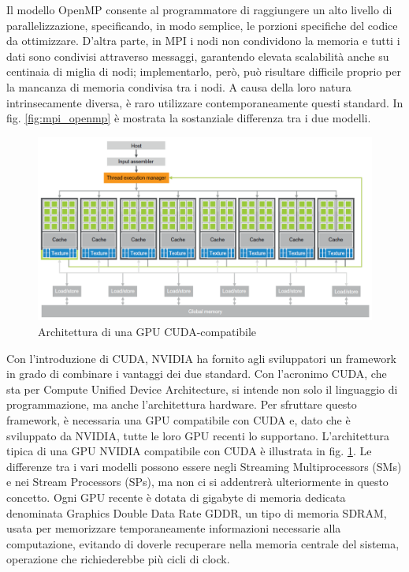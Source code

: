 Il modello OpenMP consente al programmatore di raggiungere un alto livello di parallelizzazione, specificando, in modo semplice, le porzioni specifiche del codice da ottimizzare. D'altra parte, in MPI i nodi non condividono la memoria e tutti i dati sono condivisi attraverso messaggi, garantendo elevata scalabilità anche su centinaia di miglia di nodi; implementarlo, però,  può risultare difficile proprio per la mancanza di memoria condivisa tra i nodi. A causa della loro natura intrinsecamente diversa, è raro utilizzare contemporaneamente questi standard. In fig. \ref{fig:mpi_openmp} è mostrata la sostanziale differenza tra i due modelli.

\begin{figure}[ht]
    \centering
    \includegraphics[width=.9\linewidth]{images/chapter2/cuda_arch.png}
    \caption{Architettura di una GPU CUDA-compatibile}
    \label{fig:cuda_arch}
\end{figure}

Con l'introduzione di CUDA, NVIDIA ha fornito agli sviluppatori un framework in grado di combinare i vantaggi dei due standard. Con l'acronimo CUDA, che sta per Compute Unified Device Architecture, si intende non solo il linguaggio di programmazione, ma anche l'architettura hardware. Per sfruttare questo framework, è necessaria una GPU compatibile con CUDA e, dato che è sviluppato da NVIDIA, tutte le loro GPU recenti lo supportano. L'architettura tipica di una GPU NVIDIA compatibile con CUDA è illustrata in fig. \ref{fig:cuda_arch}. Le differenze tra i vari modelli possono essere negli Streaming Multiprocessors (SMs) e nei Stream Processors (SPs), ma non ci si addentrerà ulteriormente in questo concetto. Ogni GPU recente è dotata di gigabyte di memoria dedicata denominata Graphics Double Data Rate \gls{GDDR}, un tipo di memoria SDRAM, usata per memorizzare temporaneamente informazioni necessarie alla computazione, evitando di doverle recuperare nella memoria centrale del sistema, operazione che richiederebbe più cicli di clock.


